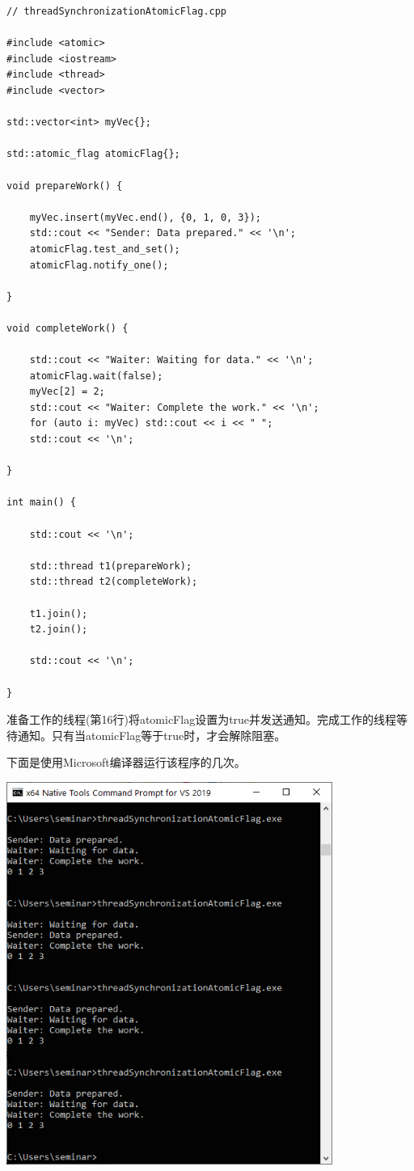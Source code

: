 \begin{lstlisting}[style=styleCXX]
// threadSynchronizationAtomicFlag.cpp

#include <atomic>
#include <iostream>
#include <thread>
#include <vector>

std::vector<int> myVec{};

std::atomic_flag atomicFlag{};

void prepareWork() {

	myVec.insert(myVec.end(), {0, 1, 0, 3});
	std::cout << "Sender: Data prepared." << '\n';
	atomicFlag.test_and_set();
	atomicFlag.notify_one();

}

void completeWork() {

	std::cout << "Waiter: Waiting for data." << '\n';
	atomicFlag.wait(false);
	myVec[2] = 2;
	std::cout << "Waiter: Complete the work." << '\n';
	for (auto i: myVec) std::cout << i << " ";
	std::cout << '\n';

}

int main() {

	std::cout << '\n';
	
	std::thread t1(prepareWork);
	std::thread t2(completeWork);
	
	t1.join();
	t2.join();
	
	std::cout << '\n';

}
\end{lstlisting}

准备工作的线程(第16行)将atomicFlag设置为true并发送通知。完成工作的线程等待通知。只有当atomicFlag等于true时，才会解除阻塞。

下面是使用Microsoft编译器运行该程序的几次。

\begin{center}
\includegraphics[width=0.8\textwidth]{content/3/chapter6/images/13.png}\\
\end{center}


